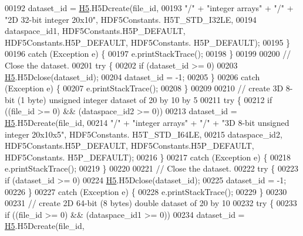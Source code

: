 \begin{DoxyCode}
00192                 dataset\_id = \hyperlink{namespace_h5}{H5}.H5Dcreate(file\_id,
00193                         \textcolor{stringliteral}{"/"} + \textcolor{stringliteral}{"integer arrays"} + \textcolor{stringliteral}{"/"} + \textcolor{stringliteral}{"2D 32-bit integer 20x10"}, HDF5Constants.
      H5T\_STD\_I32LE,
00194                         dataspace\_id1, HDF5Constants.H5P\_DEFAULT, HDF5Constants.H5P\_DEFAULT, HDF5Constants.
      H5P\_DEFAULT);
00195         \}
00196         \textcolor{keywordflow}{catch} (Exception e) \{
00197             e.printStackTrace();
00198         \}
00199 
00200         \textcolor{comment}{// Close the dataset.}
00201         \textcolor{keywordflow}{try} \{
00202             \textcolor{keywordflow}{if} (dataset\_id >= 0)
00203                 \hyperlink{namespace_h5}{H5}.H5Dclose(dataset\_id);
00204             dataset\_id = -1;
00205         \}
00206         \textcolor{keywordflow}{catch} (Exception e) \{
00207             e.printStackTrace();
00208         \}
00209 
00210         \textcolor{comment}{// create 3D 8-bit (1 byte) unsigned integer dataset of 20 by 10 by 5}
00211         \textcolor{keywordflow}{try} \{
00212             \textcolor{keywordflow}{if} ((file\_id >= 0) && (dataspace\_id2 >= 0))
00213                 dataset\_id = \hyperlink{namespace_h5}{H5}.H5Dcreate(file\_id,
00214                         \textcolor{stringliteral}{"/"} + \textcolor{stringliteral}{"integer arrays"} + \textcolor{stringliteral}{"/"} + \textcolor{stringliteral}{"3D 8-bit unsigned integer 20x10x5"}, HDF5Constants.
      H5T\_STD\_I64LE,
00215                         dataspace\_id2, HDF5Constants.H5P\_DEFAULT, HDF5Constants.H5P\_DEFAULT, HDF5Constants.
      H5P\_DEFAULT);
00216         \}
00217         \textcolor{keywordflow}{catch} (Exception e) \{
00218             e.printStackTrace();
00219         \}
00220 
00221         \textcolor{comment}{// Close the dataset.}
00222         \textcolor{keywordflow}{try} \{
00223             \textcolor{keywordflow}{if} (dataset\_id >= 0)
00224                 \hyperlink{namespace_h5}{H5}.H5Dclose(dataset\_id);
00225             dataset\_id = -1;
00226         \}
00227         \textcolor{keywordflow}{catch} (Exception e) \{
00228             e.printStackTrace();
00229         \}
00230 
00231         \textcolor{comment}{// create 2D 64-bit (8 bytes) double dataset of 20 by 10}
00232         \textcolor{keywordflow}{try} \{
00233             \textcolor{keywordflow}{if} ((file\_id >= 0) && (dataspace\_id1 >= 0))
00234                 dataset\_id = \hyperlink{namespace_h5}{H5}.H5Dcreate(file\_id,

\end{DoxyCode}
